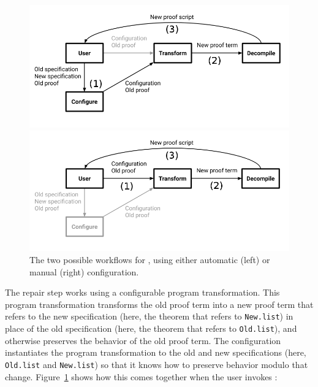 \begin{figure}
\begin{minipage}{0.49\textwidth}
\includegraphics[width=\linewidth]{workflowa.png}
\end{minipage}
\hfill
\begin{minipage}{0.49\textwidth}
\includegraphics[width=\linewidth]{workflowb.png}
\end{minipage}
\caption{The two possible workflows for \toolname, using either automatic (left) or manual (right) configuration.}
\label{fig:system}
\end{figure}

The repair step works using a configurable program transformation.
This program transformation transforms the old proof term into a new proof term that refers to the new specification
(here, the theorem that refers to \lstinline{New.list})
in place of the old specification (here, the theorem that refers to \lstinline{Old.list}),
and otherwise preserves the behavior of the old proof term.
The configuration instantiates the program transformation to the old and new specifications (here, \lstinline{Old.list} and \lstinline{New.list})
so that it knows how to preserve behavior modulo that change.
Figure~\ref{fig:system} shows how this comes together when the user invokes \toolname:

